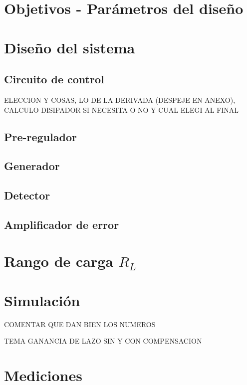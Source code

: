 



\tableofcontents
\newpage

\section{Objetivos - Par\'ametros del dise\~no}

\section{Dise\~no del sistema}
\subsection{Circuito de control}

ELECCION Y COSAS, LO DE LA DERIVADA (DESPEJE EN ANEXO), CALCULO DISIPADOR SI NECESITA O  NO Y CUAL ELEGI AL FINAL

\subsection{Pre-regulador}

\subsection{Generador}

\subsection{Detector}

\subsection{Amplificador de error}

\section{Rango de carga $R_L$}


\section{Simulación}

COMENTAR QUE DAN BIEN LOS NUMEROS \par
TEMA GANANCIA DE LAZO SIN Y CON COMPENSACION

\section{Mediciones}

